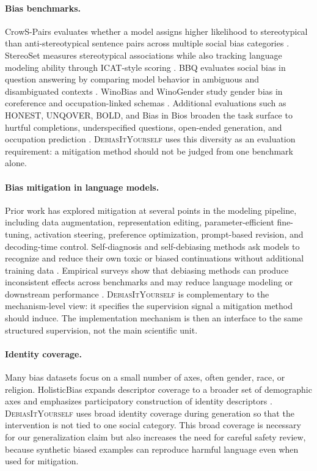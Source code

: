 \documentclass[11pt]{article}
\newcommand{\diy}{\textsc{DebiasItYourself}}
\begin{document}
\paragraph{Bias benchmarks.}
CrowS-Pairs evaluates whether a model assigns higher likelihood to stereotypical than anti-stereotypical sentence pairs across multiple social bias categories \citep{nangia-etal-2020-crows}. StereoSet measures stereotypical associations while also tracking language modeling ability through ICAT-style scoring \citep{nadeem-etal-2021-stereoset}. BBQ evaluates social bias in question answering by comparing model behavior in ambiguous and disambiguated contexts \citep{parrish-etal-2022-bbq}. WinoBias and WinoGender study gender bias in coreference and occupation-linked schemas \citep{zhao-etal-2018-gender,rudinger-etal-2018-gender}. Additional evaluations such as HONEST, UNQOVER, BOLD, and Bias in Bios broaden the task surface to hurtful completions, underspecified questions, open-ended generation, and occupation prediction \citep{nozza-etal-2021-honest,li-etal-2020-unqovering,PLACEHOLDER_bold_verify,PLACEHOLDER_biasbios_verify}. \diy{} uses this diversity as an evaluation requirement: a mitigation method should not be judged from one benchmark alone.

\paragraph{Bias mitigation in language models.}
Prior work has explored mitigation at several points in the modeling pipeline, including data augmentation, representation editing, parameter-efficient fine-tuning, activation steering, preference optimization, prompt-based revision, and decoding-time control. Self-diagnosis and self-debiasing methods ask models to recognize and reduce their own toxic or biased continuations without additional training data \citep{PLACEHOLDER_schick_selfdebias_verify}. Empirical surveys show that debiasing methods can produce inconsistent effects across benchmarks and may reduce language modeling or downstream performance \citep{PLACEHOLDER_meade_survey_verify}. \diy{} is complementary to the mechanism-level view: it specifies the supervision signal a mitigation method should induce. The implementation mechanism is then an interface to the same structured supervision, not the main scientific unit.

\paragraph{Identity coverage.}
Many bias datasets focus on a small number of axes, often gender, race, or religion. HolisticBias expands descriptor coverage to a broader set of demographic axes and emphasizes participatory construction of identity descriptors \citep{smith-etal-2022-im}. \diy{} uses broad identity coverage during generation so that the intervention is not tied to one social category. This broad coverage is necessary for our generalization claim but also increases the need for careful safety review, because synthetic biased examples can reproduce harmful language even when used for mitigation.
\end{document}
